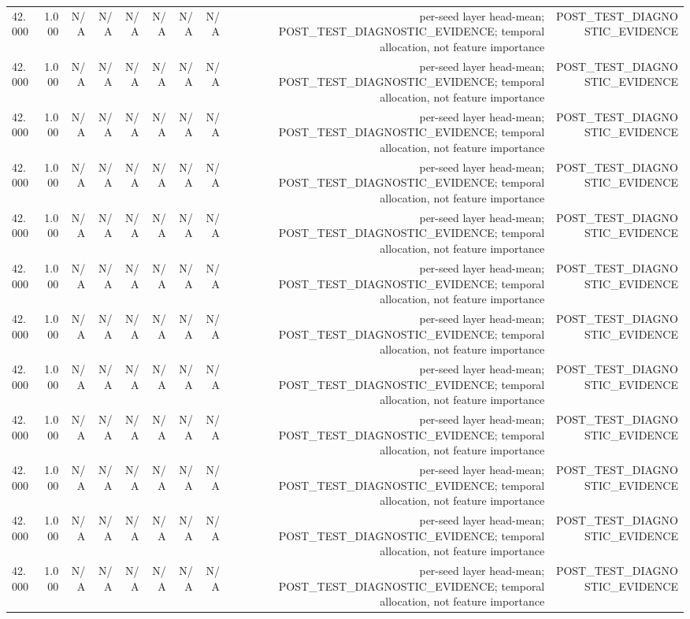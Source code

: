 \begin{table}[h!]
\begin{tabular}{lrrrrrrrrr}
42.000 & 1.000 & N/A & N/A & N/A & N/A & N/A & N/A & per-seed layer head-mean; POST\_TEST\_DIAGNOSTIC\_EVIDENCE; temporal allocation, not feature importance & POST\_TEST\_DIAGNOSTIC\_EVIDENCE \\
42.000 & 1.000 & N/A & N/A & N/A & N/A & N/A & N/A & per-seed layer head-mean; POST\_TEST\_DIAGNOSTIC\_EVIDENCE; temporal allocation, not feature importance & POST\_TEST\_DIAGNOSTIC\_EVIDENCE \\
42.000 & 1.000 & N/A & N/A & N/A & N/A & N/A & N/A & per-seed layer head-mean; POST\_TEST\_DIAGNOSTIC\_EVIDENCE; temporal allocation, not feature importance & POST\_TEST\_DIAGNOSTIC\_EVIDENCE \\
42.000 & 1.000 & N/A & N/A & N/A & N/A & N/A & N/A & per-seed layer head-mean; POST\_TEST\_DIAGNOSTIC\_EVIDENCE; temporal allocation, not feature importance & POST\_TEST\_DIAGNOSTIC\_EVIDENCE \\
42.000 & 1.000 & N/A & N/A & N/A & N/A & N/A & N/A & per-seed layer head-mean; POST\_TEST\_DIAGNOSTIC\_EVIDENCE; temporal allocation, not feature importance & POST\_TEST\_DIAGNOSTIC\_EVIDENCE \\
42.000 & 1.000 & N/A & N/A & N/A & N/A & N/A & N/A & per-seed layer head-mean; POST\_TEST\_DIAGNOSTIC\_EVIDENCE; temporal allocation, not feature importance & POST\_TEST\_DIAGNOSTIC\_EVIDENCE \\
42.000 & 1.000 & N/A & N/A & N/A & N/A & N/A & N/A & per-seed layer head-mean; POST\_TEST\_DIAGNOSTIC\_EVIDENCE; temporal allocation, not feature importance & POST\_TEST\_DIAGNOSTIC\_EVIDENCE \\
42.000 & 1.000 & N/A & N/A & N/A & N/A & N/A & N/A & per-seed layer head-mean; POST\_TEST\_DIAGNOSTIC\_EVIDENCE; temporal allocation, not feature importance & POST\_TEST\_DIAGNOSTIC\_EVIDENCE \\
42.000 & 1.000 & N/A & N/A & N/A & N/A & N/A & N/A & per-seed layer head-mean; POST\_TEST\_DIAGNOSTIC\_EVIDENCE; temporal allocation, not feature importance & POST\_TEST\_DIAGNOSTIC\_EVIDENCE \\
42.000 & 1.000 & N/A & N/A & N/A & N/A & N/A & N/A & per-seed layer head-mean; POST\_TEST\_DIAGNOSTIC\_EVIDENCE; temporal allocation, not feature importance & POST\_TEST\_DIAGNOSTIC\_EVIDENCE \\
42.000 & 1.000 & N/A & N/A & N/A & N/A & N/A & N/A & per-seed layer head-mean; POST\_TEST\_DIAGNOSTIC\_EVIDENCE; temporal allocation, not feature importance & POST\_TEST\_DIAGNOSTIC\_EVIDENCE \\
42.000 & 1.000 & N/A & N/A & N/A & N/A & N/A & N/A & per-seed layer head-mean; POST\_TEST\_DIAGNOSTIC\_EVIDENCE; temporal allocation, not feature importance & POST\_TEST\_DIAGNOSTIC\_EVIDENCE \\

\end{tabular}
\end{table}
